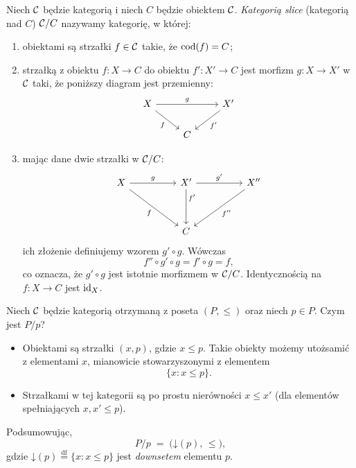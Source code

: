 \begin{definicja}
Niech $\mathcal{C}$ będzie kategorią i niech $C$ będzie obiektem $\mathcal{C}$. \emph{Kategorią slice} (kategorią nad $C$) $\mathcal{C} / C$ nazywamy kategorię, w której:
\begin{enumerate}
    \item[(a)] obiektami są strzałki $f \in \mathcal{C}$ takie, że $\mathrm{cod}(f) = C$;
    \item[(b)] strzałką z obiektu $f \colon X \to C$ do obiektu $f' \colon X' \to C$ jest morfizm $g \colon X \to X'$ w $\mathcal{C}$ taki, że poniższy diagram jest przemienny:
    \[
    \begin{tikzcd}
        X \arrow[rr, "g"] \arrow[dr, "f"'] & & X' \arrow[dl, "f'"] \\
        & C &
    \end{tikzcd}
    \]
    \item[(c)] mając dane dwie strzałki w $\mathcal{C} / C$:
    \[
    \begin{tikzcd}
        X \arrow[rr, "g"] \arrow[ddrr, "f"'] & & X' \arrow[rr, "g'"] \arrow[dd, "f'" near start] & & X'' \arrow[ddll, "f''"] \\
        & & & & \\
        & & C & &
    \end{tikzcd}
    \]
    ich złożenie definiujemy wzorem $g' \circ g$. Wówczas
    \[
        f'' \circ g' \circ g = f' \circ g = f,
    \]
    co oznacza, że $g' \circ g$ jest istotnie morfizmem w $\mathcal{C} / C$. Identycznością na $f \colon X \to C$ jest $\mathrm{id}_X$.
\end{enumerate}
\end{definicja}

\begin{przyklad}
Niech $\mathcal{C}$ będzie kategorią otrzymaną z poseta $(P, \leq)$ oraz niech $p \in P$. Czym jest $P/p$?
\begin{itemize}
    \item Obiektami są strzałki $(x, p)$, gdzie $x \leq p$. Takie obiekty możemy utożsamić z elementami $x$, mianowicie stowarzyszonymi z elementem
    \[
        \{x \colon x \leq p\}.
    \]
    \item Strzałkami w tej kategorii są po prostu nierówności $x \leq x'$ (dla elementów spełniających $x, x' \leq p$).
\end{itemize}
Podsumowując,
\[
    P/p \;=\; \bigl( \mathord{\downarrow}(p),\, \leq \bigr),
\]
gdzie $\mathord{\downarrow}(p) \stackrel{\mathrm{df}}{=} \{x \colon x \leq p\}$ jest \emph{downsetem} elementu $p$.
\end{przyklad}

